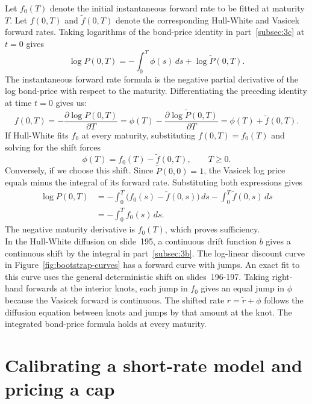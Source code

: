 \documentclass[11pt,a4paper]{article}
\begin{document}
Let $f_0(T)$ denote the initial instantaneous forward rate to be fitted at maturity $T$. Let $f(0,T)$ and $\tilde f(0,T)$ denote the corresponding Hull-White and Vasicek forward rates. Taking logarithms of the bond-price identity in part~\ref{subsec:3c} at $t=0$ gives
\[
\log P(0,T)=-\int_0^T\phi(s)\,ds+\log\tilde P(0,T).
\]
The instantaneous forward rate formula is the negative partial derivative of the log bond-price with respect to the maturity. Differentiating the preceding identity at time $t=0$ gives us:
\[
f(0,T)=-\frac{\partial \log P(0,T)}{\partial T}
      =\phi(T)-\frac{\partial \log \tilde P(0,T)}{\partial T}
      =\phi(T)+\tilde f(0,T).
\]
If Hull-White fits $f_0$ at every maturity, substituting $f(0,T)=f_0(T)$ and solving for the shift forces
\[
\phi(T)=f_0(T)-\tilde f(0,T),\qquad T\geq 0.
\]
Conversely, if we choose this shift. Since $\tilde P(0,0)=1$, the Vasicek log price equals minus the integral of its forward rate. Substituting both expressions gives
\begin{align*}
\log P(0,T)
  &=-\int_0^T\bigl(f_0(s)-\tilde f(0,s)\bigr)\,ds
    -\int_0^T\tilde f(0,s)\,ds \\
  &=-\int_0^T f_0(s)\,ds.
\end{align*}
The negative maturity derivative is $f_0(T)$, which proves sufficiency. \\
In the Hull-White diffusion on slide~195, a continuous drift function $b$ gives a continuous shift by the integral in part~\ref{subsec:3b}. The log-linear discount curve in Figure~\ref{fig:bootstrap-curves} has a forward curve with jumps. An exact fit to this curve uses the general deterministic shift on slides~196-197. Taking right-hand forwards at the interior knots, each jump in $f_0$ gives an equal jump in $\phi$ because the Vasicek forward is continuous. The shifted rate $r=\tilde r+\phi$ follows the diffusion equation between knots and jumps by that amount at the knot. The integrated bond-price formula holds at every maturity.

\section{Calibrating a short-rate model and pricing a cap}

\subsection{}
\subsection{}
\end{document}
